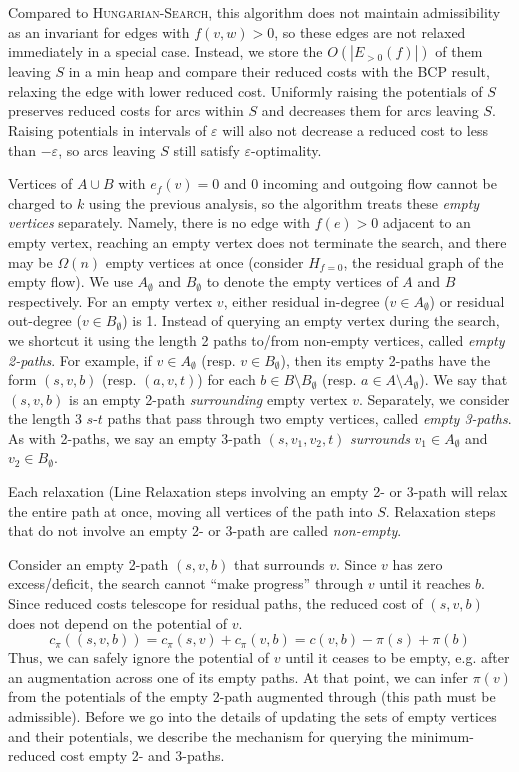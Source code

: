 \documentclass[11pt]{article}
\def\eps{\varepsilon}
\theoremstyle{plain}
\begin{document}
\begin{figure*}
Compared to \textsc{Hungarian-Search}, this algorithm does not maintain
admissibility as an invariant for edges with $f(v, w) > 0$, so these edges are
not relaxed immediately in a special case.
Instead, we store the $O(|E_{>0}(f)|)$ of them leaving $S$ in a min heap and
compare their reduced costs with the BCP result, relaxing the edge with lower
reduced cost.
Uniformly raising the potentials of $S$ preserves reduced costs for arcs within
$S$ and decreases them for arcs leaving $S$.
Raising potentials in intervals of $\eps$ will also not decrease a reduced
cost to less than $-\eps$, so arcs leaving $S$ still satisfy $\eps$-optimality.

Vertices of $A \cup B$ with $e_f(v) = 0$ and 0 incoming and outgoing flow
cannot be charged to $k$ using the previous analysis, so the algorithm treats
these \emph{empty vertices} separately.
Namely, there is no edge with $f(e) > 0$ adjacent to an empty vertex,
reaching an empty vertex does not terminate the search, and there may be
$\Omega(n)$ empty vertices at once (consider $H_{f = 0}$, the residual graph
of the empty flow).
We use $A_\emptyset$ and $B_\emptyset$ to denote the empty vertices of $A$ and
$B$ respectively.
For an empty vertex $v$, either residual in-degree ($v \in A_\emptyset$) or
residual out-degree ($v \in B_\emptyset$) is 1.
Instead of querying an empty vertex during the search, we shortcut it using the
length 2 paths to/from non-empty vertices, called \emph{empty 2-paths}.
For example, if $v \in A_\emptyset$ (resp. $v \in B_\emptyset$), then its empty
2-paths have the form $(s, v, b)$ (resp. $(a, v, t)$) for each
$b \in B \setminus B_\emptyset$ (resp. $a \in A \setminus A_\emptyset$).
We say that $(s, v, b)$ is an empty 2-path \emph{surrounding} empty vertex $v$.
Separately, we consider the length 3 $s$-$t$ paths that pass through two empty
vertices, called \emph{empty 3-paths}.
As with 2-paths, we say an empty 3-path $(s, v_1, v_2, t)$ \emph{surrounds}
$v_1 \in A_\emptyset$ and $v_2 \in B_\emptyset$.

Each relaxation (Line
Relaxation steps involving an empty 2- or 3-path will relax the entire path
at once, moving all vertices of the path into $S$.
Relaxation steps that do not involve an empty 2- or 3-path are called
\emph{non-empty}.

Consider an empty 2-path $(s, v, b)$ that surrounds $v$.
Since $v$ has zero excess/deficit, the search cannot ``make progress'' through
$v$ until it reaches $b$.
Since reduced costs telescope for residual paths, the reduced cost of
$(s, v, b)$ does not depend on the potential of $v$.
\begin{equation*}
	c_\pi((s, v, b)) = c_\pi(s, v) + c_\pi(v, b) = c(v, b) - \pi(s) + \pi(b)
\end{equation*}
Thus, we can safely ignore the potential of $v$ until it ceases to be
empty, e.g. after an augmentation across one of its empty paths.
At that point, we can infer $\pi(v)$ from the potentials of the empty 2-path
augmented through (this path must be admissible).
Before we go into the details of updating the sets of empty vertices and their
potentials, we describe the mechanism for querying the minimum-reduced cost
empty 2- and 3-paths.


\end{figure*}
\end{document}
